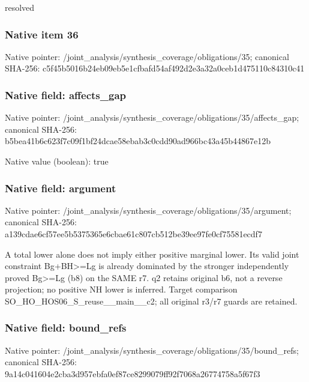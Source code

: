 \documentclass[10pt,a4paper]{article}
\begin{document}
\begingroup\raggedright\sloppy resolved\par\endgroup

\subsubsection{Native item 36}
Native pointer: /joint\_\allowbreak{}analysis/synthesis\_\allowbreak{}coverage/obligations/35; canonical SHA-256: c5f45b5016b24eb09eb5e1cfbafd54af492d2e3a32a0ceb1d475110c84310c41

\subsubsection{Native field: affects\_\allowbreak{}gap}
Native pointer: /joint\_\allowbreak{}analysis/synthesis\_\allowbreak{}coverage/obligations/35/affects\_\allowbreak{}gap; canonical SHA-256: b5bea41b6c623f7c09f1bf24dcae58ebab3c0cdd90ad966bc43a45b44867e12b

Native value (boolean): true

\subsubsection{Native field: argument}
Native pointer: /joint\_\allowbreak{}analysis/synthesis\_\allowbreak{}coverage/obligations/35/argument; canonical SHA-256: a139cdae6cf57ee5b5375365e6cbae61c807cb512be39ee97fe0cf75581ecdf7

\begingroup\raggedright\sloppy A total lower alone does not imply either positive marginal lower. Its valid joint constraint Bg+BH>=\allowbreak{}Lg is already dominated by the stronger independently proved Bg>=\allowbreak{}Lg (b8) on the SAME r7. q2 retains original b6,\allowbreak{} not a reverse projection;\allowbreak{} no positive NH lower is inferred. Target comparison SO\_\allowbreak{}HO\_\allowbreak{}HOS06\_\allowbreak{}S\_\allowbreak{}reuse\_\allowbreak{}\_\allowbreak{}main\_\allowbreak{}\_\allowbreak{}c2;\allowbreak{} all original r3/\allowbreak{}r7 guards are retained.\par\endgroup

\subsubsection{Native field: bound\_\allowbreak{}refs}
Native pointer: /joint\_\allowbreak{}analysis/synthesis\_\allowbreak{}coverage/obligations/35/bound\_\allowbreak{}refs; canonical SHA-256: 9a14c041604e2cba3d957ebfa0ef87ce8299079ff92f7068a26774758a5f67f3
\end{document}
